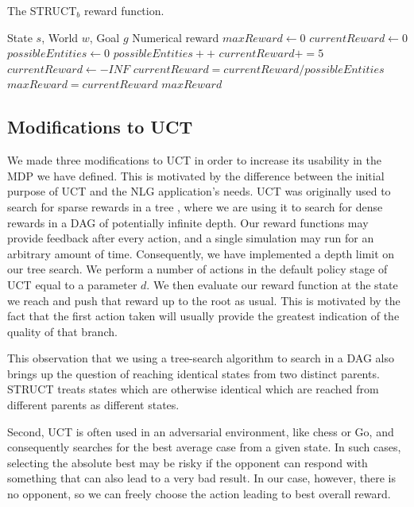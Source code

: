 \begin{algorithm}
\caption{The STRUCT$_b$ reward function.}\label{struct-b}
\begin{algorithmic}[1]
\REQUIRE State $s$, World $w$, Goal $g$
\ENSURE Numerical reward
\STATE $maxReward \gets 0$
	\STATE $currentReward \gets 0$
	\STATE $possibleEntities \gets 0$
			\STATE $possibleEntities++$
		\ENDIF
			\STATE $currentReward += 5$
		\ENDIF
		\ENDFOR
	\ENDFOR
		\STATE $currentReward \gets -INF$
	\ELSE
		\STATE $currentReward = currentReward / possibleEntities$
	\ENDIF
		\STATE $maxReward = currentReward$
	\ENDIF
\ENDFOR
\RETURN $maxReward$
\end{algorithmic}
\end{algorithm}

\subsection{Modifications to UCT}

We made three modifications to UCT in order to increase its usability
in the MDP we have defined.  This is motivated by the difference between
the initial purpose of UCT and the NLG application's needs.
UCT was originally used to search for sparse rewards
in a tree \cite{kocsis_bandit_2006}, where we are using it to search
for dense rewards in a DAG of potentially infinite depth.
Our reward functions may provide feedback after every action,
and a single simulation
may run for an arbitrary amount of time.
Consequently, we have implemented a depth limit
on our tree search.  We perform a number of actions in the
default policy stage of UCT equal to a parameter $d$.  We then
evaluate our reward function at the state we reach and push that
reward up to the root as usual.  This is motivated by the fact that the
first action taken will usually provide the greatest indication of the
quality of that branch.

This observation that we using a tree-search algorithm to search in a DAG
also brings up the question of reaching identical states
from two distinct parents.  STRUCT treats states which are otherwise
identical which are reached from different parents as different states.

Second, UCT is often used in an adversarial environment,
like chess or Go, and consequently searches for the best average case
from a given state.  In such cases,
selecting the absolute best may be risky if the opponent can respond
with something that can also lead to a very bad result. In our case,
however, there is no opponent, so we can freely choose the action
leading to best overall reward.

